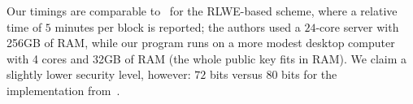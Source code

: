 \documentclass[11pt]{llncs}
\begin{document}
Our timings are comparable to~\cite{GHS2012c} for the RLWE-based scheme, where a relative time of $5$ minutes per block is
reported; the authors used a $24$-core server with 256GB of RAM, while
our program runs on a more modest desktop computer with 4 cores and
32GB of RAM (the whole public key fits in RAM).
We claim a slightly lower security level, however: $72$ bits versus $80$
bits for the implementation from~\cite{GHS2012c}.

%


\end{document}
